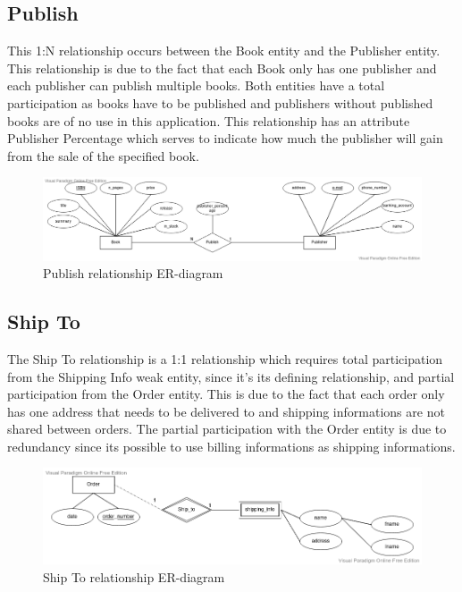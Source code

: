 \documentclass[fleqn]{scrreprt}
\begin{document}
\subsection{Publish}
This 1:N relationship occurs between the Book entity and the Publisher entity.
This relationship is due to the fact that each Book only has one publisher and
each publisher can publish multiple books. Both entities have a total
participation as books have to be published and publishers without published
books are of no use in this application. This relationship has an attribute
Publisher Percentage which serves to indicate how much the publisher will gain
from the sale of the specified book.
\begin{figure}[h]\centering
    \includegraphics[width=\columnwidth]{er-diagram-project-Publish.vpd.png}
    \caption{Publish relationship ER-diagram}\label{fig:erpu}
\end{figure}

\subsection{Ship To}
The Ship To relationship is a 1:1 relationship which requires total participation
from the Shipping Info weak entity, since it's its defining relationship,
and partial participation from the Order entity. This is due to the fact
that each order only has one address that needs to be delivered to and shipping
informations are not shared between orders. The partial participation with the
Order entity is due to redundancy since its possible to use billing informations
as shipping informations.
\begin{figure}[h]\centering
    \includegraphics[width=\columnwidth]{er-diagram-project-Ship-To.vpd.png}
    \caption{Ship To relationship ER-diagram}\label{fig:erst}
\end{figure}
\end{document}
